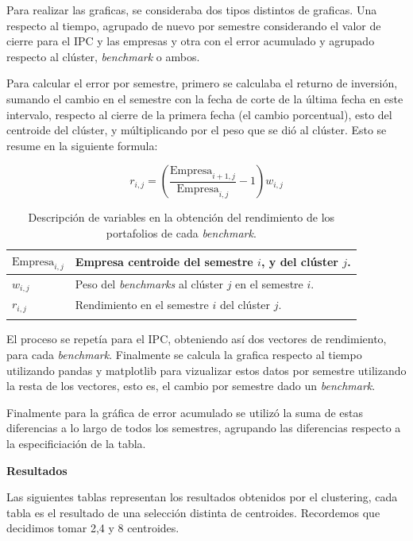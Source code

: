 \documentclass[
]{article}
\begin{document}
Para realizar las graficas, se consideraba dos tipos distintos de graficas. 
Una respecto al tiempo, agrupado de nuevo por semestre considerando el valor de cierre
para el IPC y las empresas y otra con el error acumulado y agrupado respecto al clúster, 
\emph{benchmark} o ambos.

Para calcular el error por semestre, primero se calculaba el returno de inversión, sumando
el cambio en el semestre con la fecha de corte de la última fecha en este intervalo,
respecto al cierre de la primera fecha (el cambio porcentual), esto del centroide del clúster,
y múltiplicando por el peso que se dió al clúster. Esto se resume en la siguiente formula:

\begin{equation}
	r_{i,j} = \left(\frac{\text{Empresa}_{i+1,j}}{\text{Empresa}_{i,j}}-1\right)w_{i,j}
\end{equation}

\begin{longtable}[]{@{}
>{\raggedright\arraybackslash}p{}
>{\raggedright\arraybackslash}p{}@{}}
\toprule()
\center \(\text{Empresa}_{i,j}\) & Empresa centroide del semestre $i$, y del clúster $j$. \\
\midrule
\center \(w_{i,j}\) & Peso del \emph{benchmarks} al clúster $j$ en el semestre $i$.\\
\midrule()
\center \(r_{i,j}\) & Rendimiento en el semestre $i$ del clúster $j$. \\
\bottomrule()
\caption{Descripción de variables en la obtención del rendimiento de los portafolios de cada \emph{benchmark}.}
\end{longtable}

El proceso se repetía para el IPC, obteniendo así dos vectores de rendimiento,
para cada \emph{benchmark}. Finalmente se calcula la grafica respecto al tiempo utilizando
pandas y matplotlib para vizualizar estos datos por semestre utilizando la resta de los vectores,
esto es, el cambio por semestre dado un \emph{benchmark}.

Finalmente para la gráfica de error acumulado se utilizó la suma de estas diferencias a lo
largo de todos los semestres, agrupando las diferencias respecto a la especificiación de la tabla.

\textbf{Resultados}

Las siguientes tablas representan los resultados obtenidos por el clustering, 
cada tabla es el resultado de una selección distinta de centroides. Recordemos 
que decidimos tomar 2,4 y 8 centroides.
\end{document}
